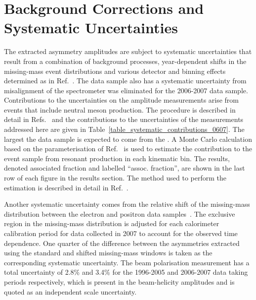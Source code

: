 \section{Background Corrections and Systematic Uncertainties}
The extracted asymmetry amplitudes are subject to systematic uncertainties that
result from a combination of background processes, year-dependent
shifts in the missing-mass event distributions and various detector and binning
effects determined as in Ref.~\cite{2009a,HERMESCollaboration2008}. The
 data sample also has a systematic uncertainty from misalignment of the spectrometer was eliminated for the 2006-2007 data sample. Contributions to the uncertainties on the amplitude measurements arise from  events that include neutral meson production. The procedure is described in detail in Refs.~\cite{2009a,HERMESCollaboration2008} and the contributions to the uncertainties of the measurements addressed here are given in Table~\ref{table_systematic_contributions_0607}. The largest  the data sample is expected to come from the . A Monte Carlo calculation based on the parameterisation of Ref.~\cite{brasse} is used to estimate the contribution to the event sample from resonant production in each kinematic bin. The results, denoted associated fraction and labelled ``assoc. fraction'', are shown in the last row of each figure in the results section. The method used to perform the estimation is described in detail in
Ref.~\cite{HERMESCollaboration2008}.

Another  systematic uncertainty comes from the relative shift of the
missing-mass distribution between the electron and positron data
samples~\cite{Burnsth2010,Zeiler2009}. The exclusive region in the missing-mass
distribution is adjusted for each calorimeter calibration period for data
collected in 2007 to account for the observed time dependence. One
quarter of the difference between the asymmetries extracted using the standard
and shifted missing-mass windows is taken as the corresponding systematic
uncertainty. The beam polarisation measurement has a total uncertainty of 2.8\% and 3.4\% for the 1996-2005 and 2006-2007 data taking periods respectively,
which is present in the beam-helicity amplitudes and is quoted as an
independent scale uncertainty.

